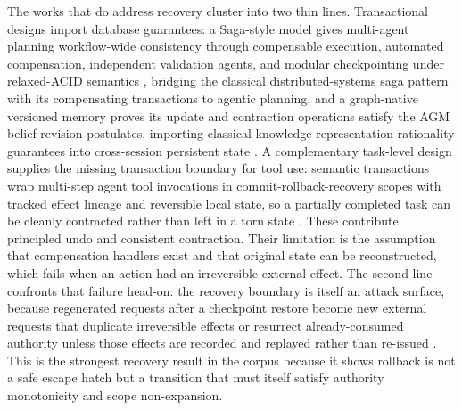 The works that do address recovery cluster into two thin lines. Transactional designs import database guarantees: a Saga-style model gives multi-agent planning workflow-wide consistency through compensable execution, automated compensation, independent validation agents, and modular checkpointing under relaxed-ACID semantics \citep{chang2025sagallm}, bridging the classical distributed-systems saga pattern with its compensating transactions to agentic planning, and a graph-native versioned memory proves its update and contraction operations satisfy the AGM belief-revision postulates, importing classical knowledge-representation rationality guarantees into cross-session persistent state \citep{park2026kumiho}. A complementary task-level design supplies the missing transaction boundary for tool use: semantic transactions wrap multi-step agent tool invocations in commit-rollback-recovery scopes with tracked effect lineage and reversible local state, so a partially completed task can be cleanly contracted rather than left in a torn state \citep{chen2026cordon}. These contribute principled undo and consistent contraction. Their limitation is the assumption that compensation handlers exist and that original state can be reconstructed, which fails when an action had an irreversible external effect. The second line confronts that failure head-on: the recovery boundary is itself an attack surface, because regenerated requests after a checkpoint restore become new external requests that duplicate irreversible effects or resurrect already-consumed authority unless those effects are recorded and replayed rather than re-issued \citep{zheng2026acrfence}. This is the strongest recovery result in the corpus because it shows rollback is not a safe escape hatch but a transition that must itself satisfy authority monotonicity and scope non-expansion.

